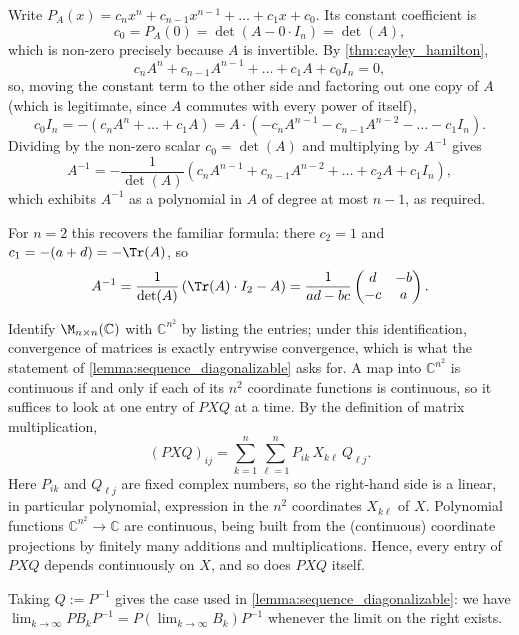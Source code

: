 \begin{exercisesolution}
\label{sol:cayley_inverse}
  Write $P_A(x) = c_n x^n + c_{n-1}x^{n-1} + \dots + c_1 x + c_0$. Its constant coefficient is
  \[ c_0 = P_A(0) = \det(A - 0 \cdot I_n) = \det(A), \]
  which is non-zero precisely because $A$ is invertible. By \cref{thm:cayley_hamilton},
  \[ c_n A^n + c_{n-1}A^{n-1} + \dots + c_1 A + c_0 I_n = 0, \]
  so, moving the constant term to the other side and factoring out one copy of $A$ (which is legitimate, since $A$ commutes with every power of itself),
  \[ c_0 I_n = -\left( c_n A^n + \dots + c_1 A \right) = A \cdot \left( -c_n A^{n-1} - c_{n-1}A^{n-2} - \dots - c_1 I_n \right). \]
  Dividing by the non-zero scalar $c_0 = \det(A)$ and multiplying by $A^{-1}$ gives
  \[ A^{-1} = -\frac{1}{\det(A)} \left( c_n A^{n-1} + c_{n-1} A^{n-2} + \dots + c_2 A + c_1 I_n \right), \]
  which exhibits $A^{-1}$ as a polynomial in $A$ of degree at most $n-1$, as required.

  For $n = 2$ this recovers the familiar formula: there $c_2 = 1$ and $c_1 = -(a+d) = -\Tr(A)$, so
  \[ A^{-1} = \frac{1}{\det(A)} \left( \Tr(A) \cdot I_2 - A \right) = \frac{1}{ad-bc} \begin{pmatrix} d & -b \\ -c & a \end{pmatrix}. \]
\end{exercisesolution}

\begin{exercisesolution}
\label{sol:conjugation_continuous}
  Identify $\M_{n \times n}(\mathbb{C})$ with $\mathbb{C}^{n^2}$ by listing the entries; under this identification, convergence of matrices is exactly entrywise convergence, which is what the statement of \cref{lemma:sequence_diagonalizable} asks for. A map into $\mathbb{C}^{n^2}$ is continuous if and only if each of its $n^2$ coordinate functions is continuous, so it suffices to look at one entry of $PXQ$ at a time. By the definition of matrix multiplication,
  \[ (P X Q)_{ij} = \sum_{k=1}^n \sum_{\ell=1}^n P_{ik} \, X_{k\ell} \, Q_{\ell j}. \]
  Here $P_{ik}$ and $Q_{\ell j}$ are fixed complex numbers, so the right-hand side is a linear, in particular polynomial, expression in the $n^2$ coordinates $X_{k\ell}$ of $X$. Polynomial functions $\mathbb{C}^{n^2} \to \mathbb{C}$ are continuous, being built from the (continuous) coordinate projections by finitely many additions and multiplications. Hence, every entry of $PXQ$ depends continuously on $X$, and so does $PXQ$ itself.

  Taking $Q := P^{-1}$ gives the case used in \cref{lemma:sequence_diagonalizable}: we have $\lim_{k \to \infty} P B_k P^{-1} = P \left( \lim_{k \to \infty} B_k \right) P^{-1}$ whenever the limit on the right exists.
\end{exercisesolution}

